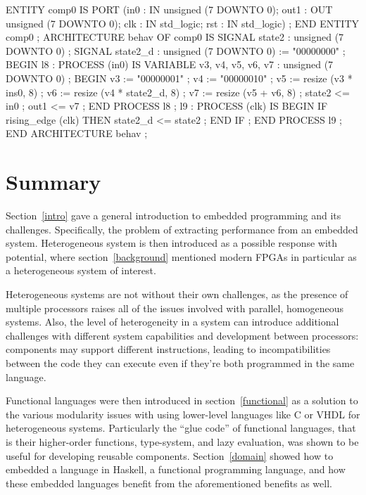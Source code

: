 \documentclass[../paper.tex]{subfiles}
\begin{document}
\begin{code}
ENTITY comp0 IS
  PORT (in0 : IN unsigned (7 DOWNTO 0);
        out1 : OUT unsigned (7 DOWNTO 0);
        clk : IN std_logic;
        rst : IN std_logic) ;
END ENTITY comp0 ;
ARCHITECTURE behav OF comp0 IS
  SIGNAL state2 : unsigned (7 DOWNTO 0) ;
  SIGNAL state2_d : unsigned (7 DOWNTO 0) := "00000000" ;
BEGIN
  l8 :
    PROCESS (in0) IS
      VARIABLE v3, v4, v5, v6, v7 : unsigned (7 DOWNTO 0) ; 
    BEGIN
      v3 := "00000001" ;
      v4 := "00000010" ;
      v5 := resize (v3 * ins0, 8) ;
      v6 := resize (v4 * state2_d, 8) ;
      v7 := resize (v5 + v6, 8) ;
      state2 <= in0 ;
      out1 <= v7 ;
    END PROCESS l8 ;
  l9 :
    PROCESS (clk) IS
    BEGIN
      IF rising_edge (clk) THEN
        state2_d <= state2 ;
      END IF ;
    END PROCESS l9 ;
END ARCHITECTURE behav ;
\end{code}

\section{Summary}

Section~\ref{intro} gave a general introduction to embedded programming and its challenges. Specifically, the problem of extracting performance from an embedded system. Heterogeneous system is then introduced as a possible response with potential, where section~\ref{background} mentioned modern FPGAs in particular as a heterogeneous system of interest.

Heterogeneous systems are not without their own challenges, as the presence of multiple processors raises all of the issues involved with parallel, homogeneous systems. Also, the level of heterogeneity in a system can introduce additional challenges with different system capabilities and development between processors: components may support different instructions, leading to incompatibilities between the code they can execute even if they're both programmed in the same language.

Functional languages were then introduced in section~\ref{functional} as a solution to the various modularity issues with using lower-level languages like C or VHDL for heterogeneous systems. Particularly the ``glue code'' of functional languages, that is their higher-order functions, type-system, and lazy evaluation, was shown to be useful for developing reusable components. Section~\ref{domain} showed how to embedded a language in Haskell, a functional programming language, and how these embedded languages benefit from the aforementioned benefits as well.
\end{document}
